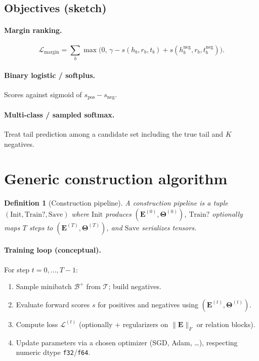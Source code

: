 \documentclass[11pt]{article}
\newtheorem{definition}{Definition}
\begin{document}
\subsection{Objectives (sketch)}
\paragraph{Margin ranking.}
\begin{equation}
  \mathcal{L}_{\mathrm{margin}} = \sum_{b} \max\bigl(0,\, \gamma - s(h_b,r_b,t_b) + s(h_b^{\text{neg}}, r_b, t_b^{\text{neg}}) \bigr).
\end{equation}

\paragraph{Binary logistic / softplus.}
Scores against sigmoid of $s_{\mathrm{pos}} - s_{\mathrm{neg}}$.

\paragraph{Multi-class / sampled softmax.}
Treat tail prediction among a candidate set including the true tail and $K$ negatives.

\section{Generic construction algorithm}

\begin{definition}[Construction pipeline]
A \emph{construction pipeline} is a tuple $(\mathrm{Init}, \mathrm{Train?}, \mathrm{Save})$ where $\mathrm{Init}$ produces $(\bm{E}^{(0)}, \bm{\Theta}^{(0)})$, $\mathrm{Train?}$ optionally maps $T$ steps to $(\bm{E}^{(T)}, \bm{\Theta}^{(T)})$, and $\mathrm{Save}$ serializes tensors.
\end{definition}

\paragraph{Training loop (conceptual).}
For step $t = 0,\ldots,T-1$:
\begin{enumerate}
  \item Sample minibatch $\mathcal{B}^+$ from $\mathcal{T}$; build negatives.
  \item Evaluate forward scores $s$ for positives and negatives using $(\bm{E}^{(t)}, \bm{\Theta}^{(t)})$.
  \item Compute loss $\mathcal{L}^{(t)}$ (optionally + regularizers on $\lVert \bm{E} \rVert_F$ or relation blocks).
  \item Update parameters via a chosen optimizer (SGD, Adam, \ldots), respecting numeric dtype \texttt{f32}/\texttt{f64}.
\end{enumerate}
\end{document}
